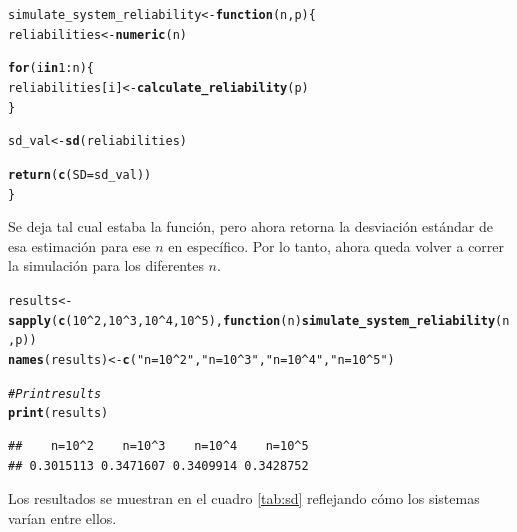 \documentclass[12pt]{article}\usepackage[]{graphicx}\usepackage[]{xcolor}
\makeatletter
\newcommand{\hlnum}[1]{\textcolor[rgb]{0.686,0.059,0.569}{#1}}%
\newcommand{\hlsng}[1]{\textcolor[rgb]{0.192,0.494,0.8}{#1}}%
\newcommand{\hlcom}[1]{\textcolor[rgb]{0.678,0.584,0.686}{\textit{#1}}}%
\newcommand{\hlopt}[1]{\textcolor[rgb]{0,0,0}{#1}}%
\newcommand{\hldef}[1]{\textcolor[rgb]{0.345,0.345,0.345}{#1}}%
\newcommand{\hlkwa}[1]{\textcolor[rgb]{0.161,0.373,0.58}{\textbf{#1}}}%
\newcommand{\hlkwb}[1]{\textcolor[rgb]{0.69,0.353,0.396}{#1}}%
\newcommand{\hlkwc}[1]{\textcolor[rgb]{0.333,0.667,0.333}{#1}}%
\newcommand{\hlkwd}[1]{\textcolor[rgb]{0.737,0.353,0.396}{\textbf{#1}}}%
\newenvironment{kframe}{%
 \def\at@end@of@kframe{}%
 \ifinner\ifhmode%
  \def\at@end@of@kframe{\end{minipage}}%
  \begin{minipage}{\columnwidth}%
 \fi\fi%
 \def\FrameCommand##1{\hskip\@totalleftmargin \hskip-\fboxsep
 \colorbox{shadecolor}{##1}\hskip-\fboxsep
     \hskip-\linewidth \hskip-\@totalleftmargin \hskip\columnwidth}%
 \MakeFramed {\advance\hsize-\width
   \@totalleftmargin\z@ \linewidth\hsize
   \@setminipage}}%
 {\par\unskip\endMakeFramed%
 \at@end@of@kframe}
\newenvironment{knitrout}{}{} %
\makeatother
\begin{document}
\begin{knitrout}
\color{fgcolor}\begin{kframe}
\begin{alltt}
\hldef{simulate_system_reliability} \hlkwb{<-} \hlkwa{function}\hldef{(}\hlkwc{n}\hldef{,} \hlkwc{p}\hldef{) \{}
 \hldef{reliabilities} \hlkwb{<-} \hlkwd{numeric}\hldef{(n)}

 \hlkwa{for} \hldef{(i} \hlkwa{in} \hlnum{1}\hlopt{:}\hldef{n) \{}
   \hldef{reliabilities[i]} \hlkwb{<-} \hlkwd{calculate_reliability}\hldef{(p)}
 \hldef{\}}

 \hldef{sd_val} \hlkwb{<-} \hlkwd{sd}\hldef{(reliabilities)}

 \hlkwd{return}\hldef{(}\hlkwd{c}\hldef{(}\hlkwc{SD} \hldef{= sd_val))}
\hldef{\}}
\end{alltt}
\end{kframe}
\end{knitrout}


Se deja tal cual estaba la función, pero ahora retorna la desviación estándar de esa estimación para ese $n$ en específico. Por lo tanto, ahora queda volver a correr la simulación para los diferentes $n$.

\begin{knitrout}
\color{fgcolor}\begin{kframe}
\begin{alltt}
\hldef{results} \hlkwb{<-} \hlkwd{sapply}\hldef{(}\hlkwd{c}\hldef{(}\hlnum{10}\hlopt{^}\hlnum{2}\hldef{,} \hlnum{10}\hlopt{^}\hlnum{3}\hldef{,} \hlnum{10}\hlopt{^}\hlnum{4}\hldef{,} \hlnum{10}\hlopt{^}\hlnum{5}\hldef{),} \hlkwa{function}\hldef{(}\hlkwc{n}\hldef{)} \hlkwd{simulate_system_reliability}\hldef{(n, p))}
\hlkwd{names}\hldef{(results)} \hlkwb{<-} \hlkwd{c}\hldef{(}\hlsng{"n=10^2"}\hldef{,} \hlsng{"n=10^3"}\hldef{,} \hlsng{"n=10^4"}\hldef{,} \hlsng{"n=10^5"}\hldef{)}

\hlcom{# Print results}
\hlkwd{print}\hldef{(results)}
\end{alltt}
\begin{verbatim}
##    n=10^2    n=10^3    n=10^4    n=10^5 
## 0.3015113 0.3471607 0.3409914 0.3428752
\end{verbatim}
\end{kframe}
\end{knitrout}

Los resultados se muestran en el cuadro \ref{tab:sd} reflejando cómo los sistemas varían entre ellos.
\end{document}
